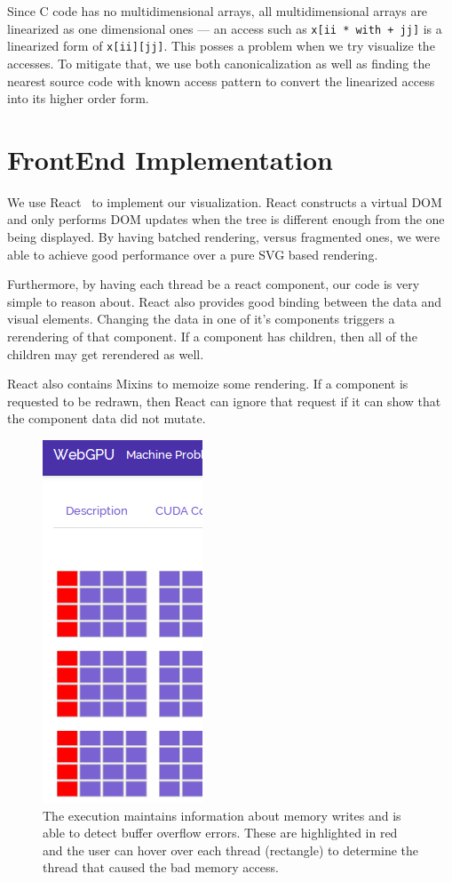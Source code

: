 \documentclass[nocopyrightspace]{sigchi}
\begin{document}
Since C code has no multidimensional arrays, all multidimensional arrays are 
linearized as one dimensional ones --- an access such as
{\tt x[ii * with + jj]} is a linearized form of {\tt x[ii][jj]}.
This posses a problem when we try
visualize the accesses. To mitigate that, we use both canonicalization 
as well as finding the nearest source code with known access pattern to
convert the linearized access into its higher order form.




\section{FrontEnd Implementation}

We use React~\cite{reynders2014multi} to implement our visualization.
React constructs a virtual DOM and only performs DOM updates when
the tree is different enough from the one being displayed. 
By having batched rendering, versus fragmented ones, we 
were able to achieve good performance over a pure SVG based 
rendering.

Furthermore, by having each thread be a react component, our code
is very simple to reason about. React also provides good binding 
between the data and visual elements. Changing the data in 
one of it's components triggers a rerendering of that component.
If a component has children, then all of the children may get
rerendered as well.

React also contains Mixins to memoize some rendering. If a 
component is requested to be redrawn, then React can ignore 
that request if it can show that the component data did not 
mutate.

\begin{figure}[!h]
\centering
\includegraphics[height=0.9\columnwidth]{1}
\caption{The execution maintains information about memory writes and is able 
to detect buffer overflow errors. These are highlighted in red and the user
can hover over each thread (rectangle) to determine the thread that caused
the bad memory access.}
\label{fig:pipeline}
\end{figure}
\end{document}
